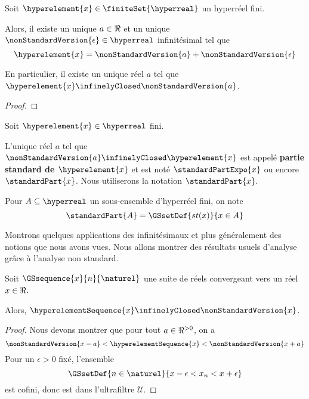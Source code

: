 \begin{proposition}
	Soit $\hyperelement{x} \in \finiteSet{\hyperreal}$ un hyperréel fini.

	Alors, il existe un unique $a \in \real$ et un unique
	$\nonStandardVersion{\epsilon} \in \hyperreal$
	infinitésimal tel que
	\begin{equation}
		\hyperelement{x} = \nonStandardVersion{a} +
		\nonStandardVersion{\epsilon}
	\end{equation}

	En particulier, il existe un unique réel $a$ tel que $\hyperelement{x}
	\infinelyClosed \nonStandardVersion{a}$.
\end{proposition}

\ifdefined\outputproof
\begin{proof}

\end{proof}
\fi

\begin{definition} 
	Soit $\hyperelement{x} \in \hyperreal$ fini.

	L'unique réel $a$ tel que $\nonStandardVersion{a} \infinelyClosed
	\hyperelement{x}$ est appelé \textbf{partie standard de $\hyperelement{x}$}
	et est noté $\standardPartExpo{x}$ ou encore $\standardPart{x}$. Nous
	utiliserons la notation $\standardPart{x}$.
\end{definition}

\begin{notation}
	Pour $A \subseteq \hyperreal$ un sous-ensemble d'hyperréel fini, on note
	\begin{equation}
		\standardPart{A} = \GSsetDef{st(x)}{x \in A}
	\end{equation}
\end{notation}

Montrons quelques applications des infinitésimaux et plus généralement des
notions que nous avons vues. Nous allons montrer des résultats usuels d'analyse
grâce à l'analyse non standard.

\begin{proposition}
	Soit $\GSsequence{x}{n}{\naturel}$ une suite de réels convergeant vers un
	réel $x \in \real$.

	Alors, $\hyperelementSequence{x} \infinelyClosed \nonStandardVersion{x}$.
\end{proposition}

\ifdefined\outputproof
\begin{proof}
	Nous devons montrer que pour tout $a \in \real^{> 0}$, on a
	\begin{equation}
		\nonStandardVersion{x - a} < \hyperelementSequence{x} < \nonStandardVersion{x +
		a}
	\end{equation}
	Pour un $\epsilon > 0$ fixé, l'ensemble
	\begin{equation}
		\GSsetDef{n \in \naturel}{x - \epsilon < x_{n} < x + \epsilon}
	\end{equation}
	est cofini, donc est dans l'ultrafiltre $\mathcal{U}$.
\end{proof}
\fi

